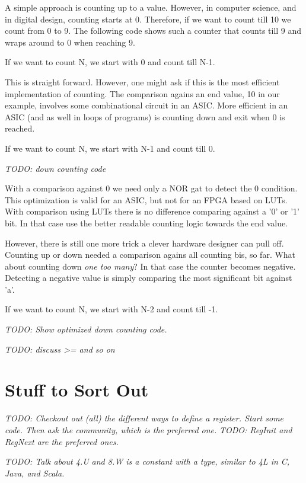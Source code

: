 \documentclass[%
    10pt, %
    headinclude, footexclude,
    openright, %
    notitlepage,
    cleardoubleempty,
    headsepline,
    pointlessnumbers,
    bibtotoc, idxtotoc,
    ]{scrbook}
\newcommand{\todo}[1]{{\emph{TODO: #1}}}
\begin{document}
A simple approach is counting up to a value. However, in computer science,
and in digital design, counting starts at 0. Therefore, if we want to count till
10 we count from 0 to 9. The following code shows such a counter that counts
till 9 and wraps around to 0 when reaching 9.

If we want to count N, we start with 0 and count till N-1.





This is straight forward. However, one might ask if this is the most efficient
implementation of counting. The comparison agains an end value, 10 in our
example, involves some combinational circuit in an ASIC. More efficient in an
ASIC (and as well in loops of programs) is counting down and exit when 0
is reached.

If we want to count N, we start with N-1 and count till 0.

\todo{down counting code}

With a comparison against 0 we need only a NOR gat to detect the 0 condition.
This optimization is valid for an ASIC, but not for an FPGA based on LUTs.
With comparison using LUTs there is no difference comparing against a '0' or
'1' bit. In that case use the better readable counting logic towards the end value.

However, there is still one more trick a clever hardware designer can pull off.
Counting up or down needed a comparison agains all counting bis, so far.
What about counting down \emph{one too many}? In that case the counter
becomes negative. Detecting a negative value is simply comparing the
most significant bit against 'a'.

If we want to count N, we start with N-2 and count till -1.

\todo{Show optimized down counting code.}

\todo{discuss >= and so on}


\section{Stuff to Sort Out}

\todo{Checkout out (all) the different ways to define a register.
Start some code.
Then ask the community, which is the preferred one.}
\todo{RegInit and RegNext are the preferred ones.}



\todo{Talk about 4.U and 8.W is a constant with a type, similar to 4L in C, Java, and Scala.}
\end{document}
